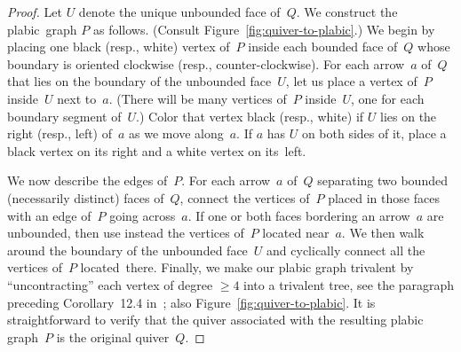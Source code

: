\documentclass[ALCO,ThmDefs,Unicode,epreuves,published]{cedram}
\begin{document}
\begin{proof}
Let $U$ denote the unique unbounded face of~$Q$. 
We construct the plabic~graph $P$ as follows. 
(Consult Figure~\ref{fig:quiver-to-plabic}.) 
We begin by placing one black (resp., white) vertex of~$P$ inside each bounded face of~$Q$ 
whose boundary is oriented clockwise (resp., counter-clockwise). 
For each arrow~$a$ of~$Q$ that lies on the boundary of the unbounded face~$U$,
let us place a vertex of~$P$ inside~$U$ next to~$a$. 
(There will be many vertices of~$P$ inside~$U$, one for each boundary segment of~$U$.) 
Color that vertex black (resp., white) if $U$ lies on the right (resp., left) of~$a$ as we move along~$a$. 
If $a$ has $U$ on both sides of it, place a black vertex on its right and a white vertex on its~left. 

We now describe the edges of~$P$. 
For each arrow~$a$ of~$Q$ separating two bounded (necessarily distinct) faces of~$Q$, 
connect the vertices of~$P$ placed in those faces with an edge of~$P$ going across~$a$.
If one or both faces bordering an arrow~$a$ are unbounded, then use instead 
the vertices of~$P$ located near~$a$. 
We then walk around the boundary of the unbounded face~$U$ 
and cyclically connect all the vertices of~$P$ located~there. 
%
Finally, we make our plabic graph trivalent by ``uncontracting'' each vertex of degree $\ge 4$ into a trivalent tree, 
see the paragraph preceding Corollary~12.4 in~\cite{postnikov}; \cf also Figure~\ref{fig:quiver-to-plabic}.
%
It is straightforward to verify that the quiver associated with the resulting plabic graph~$P$
is the original quiver~$Q$. 
\end{proof}
\end{document}
